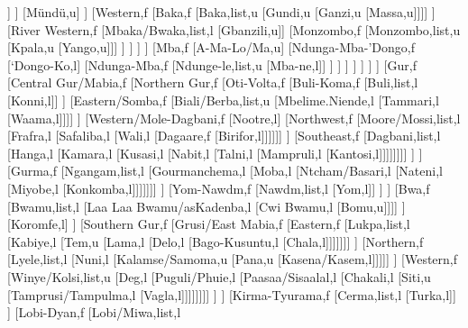 \documentclass[landscape]{standalone}
\begin{document}
\begin{forest}
								[Ngbaka,f
									[Eastern,f
										[Mayogo-Bangba,f
											[Bangba,list,u
											[Mayogo,u]]
										]
										[Mündü,u]
									]
									[Western,f
										[Baka,f
											[Baka,list,u
											[Gundi,u
											[Ganzi,u
											[Massa,u]]]]
										]
										[River Western,f
											[Mbaka/Bwaka,list,l
											[Gbanzili,u]]
											[Monzombo,f
												[Monzombo,list,u
												[Kpala,u
												[Yango,u]]]
											]
										]
									]
								]
								[Mba,f
									[A-Ma-Lo/Ma,u]
									[Ndunga-Mba-'Dongo,f
										[`Dongo-Ko,l]
										[Ndunga-Mba,f
											[Ndunge-le,list,u
											[Mba-ne,l]]
										]
									]
								]
							]
						]
					]
				]
				[Gur,f
					[Central Gur/Mabia,f
						[Northern Gur,f
							[Oti-Volta,f
								[Buli-Koma,f
									[Buli,list,l
									[Konni,l]]
								]
								[Eastern/Somba,f
									[Biali/Berba,list,u
									[Mbelime.Niende,l
									[Tammari,l
									[Waama,l]]]]
								]
								[Western/Mole-Dagbani,f
									[Nootre,l]
									[Northwest,f
										[Moore/Mossi,list,l
										[Frafra,l
										[Safaliba,l
										[Wali,l
										[Dagaare,f
										[Birifor,l]]]]]]
									]
									[Southeast,f
										[Dagbani,list,l
										[Hanga,l
										[Kamara,l
										[Kusasi,l
										[Nabit,l
										[Talni,l
										[Mampruli,l
										[Kantosi,l]]]]]]]]
									]
								]
								[Gurma,f
									[Ngangam,list,l
									[Gourmanchema,l
									[Moba,l
									[Ntcham/Basari,l
									[Nateni,l
									[Miyobe,l
									[Konkomba,l]]]]]]]
								]
								[Yom-Nawdm,f
									[Nawdm,list,l
									[Yom,l]]
								]
							]
							[Bwa,f
								[Bwamu,list,l
								[Laa Laa Bwamu/asKadenba,l
								[Cwi Bwamu,l
								[Bomu,u]]]]
							]
							[Koromfe,l]
						]
						[Southern Gur,f
							[Grusi/East Mabia,f
								[Eastern,f
									[Lukpa,list,l
									[Kabiye,l
									[Tem,u
									[Lama,l
									[Delo,l
									[Bago-Kusuntu,l
									[Chala,l]]]]]]]
								]
								[Northern,f
									[Lyele,list,l
									[Nuni,l
									[Kalamse/Samoma,u
									[Pana,u
									[Kasena/Kasem,l]]]]]
								]
								[Western,f
									[Winye/Kolsi,list,u
									[Deg,l
									[Puguli/Phuie,l
									[Paasaa/Sisaalal,l
									[Chakali,l
									[Siti,u
									[Tamprusi/Tampulma,l
									[Vagla,l]]]]]]]]
								]
							]
							[Kirma-Tyurama,f
								[Cerma,list,l
								[Turka,l]]
							]
							[Lobi-Dyan,f
								[Lobi/Miwa,list,l

\end{forest}
\end{document}
